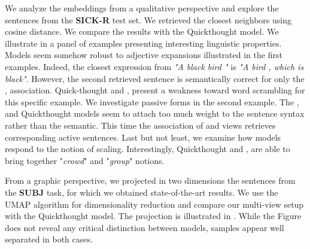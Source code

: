 We analyze the embeddings from a qualitative perspective and explore the sentences from the \textbf{SICK-R} test set. We retrieved the closest neighbors using cosine distance. We compare the results with the Quickthought model. We illustrate in  a panel of examples presenting interesting linguistic properties. Models seem somehow robust to adjective expansions illustrated in the first examples. Indeed, the closest expression from \textit{"A black bird "} is \textit{"A bird , which is black"}. However, the second retrieved sentence is semantically correct for only the \const, \seq association. Quick-thought and \dep, \const present a weakness toward word scrambling for this specific example. We investigate passive forms in the second example. The \const, \seq and Quickthought models seem to attach too much weight to the sentence syntax rather than the semantic. This time the association of \dep and \const views retrieves  corresponding active sentences. Last but not least, we examine how models respond to the notion of scaling. Interestingly, Quickthought and \dep, \const are able to bring together "\textit{crowd}" and "\textit{group}" notions.

From a graphic perspective, we projected in two dimensions the sentences from the \textbf{SUBJ} task, for which we obtained state-of-the-art results. We use the UMAP \parencite{mcinnes_18} algorithm for dimensionality reduction and compare our multi-view setup with the Quickthought model. The projection is illustrated in . While the Figure does not reveal any critical distinction between models, samples appear well separated in both cases.


